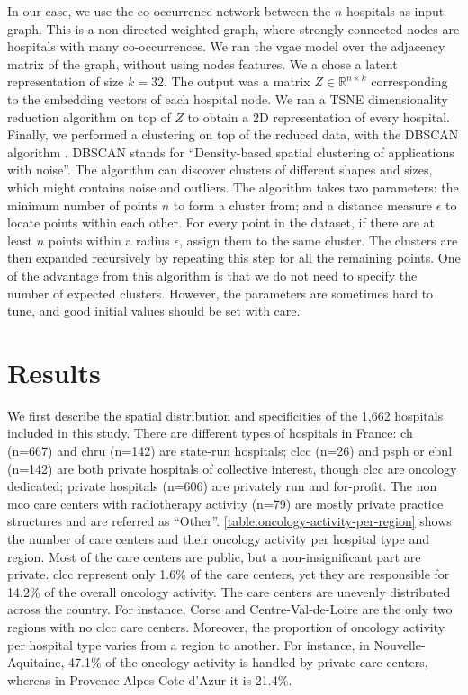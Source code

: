 In our case, we use the co-occurrence network between the $n$ hospitals as input
graph. This is a non directed weighted graph, where strongly connected nodes are
hospitals with many co-occurrences. We ran the \ac{vgae} model over the
adjacency matrix of the graph, without using nodes features. We a chose a latent
representation  of size $k=32$. The output was a matrix $Z \in \mathbb{R}^{n
        \times k }$ corresponding to the embedding vectors of each hospital node. We ran
a TSNE \cite{van_der_maaten_viualizing_2008} dimensionality reduction algorithm
on top of $Z$ to obtain a 2D representation of every hospital. Finally, we
performed a clustering on top of the reduced data, with the DBSCAN algorithm
\cite{ester_density-based_1996}. DBSCAN stands for ``Density-based spatial
clustering of applications with noise''. The algorithm can discover clusters of
different shapes and sizes, which might contains noise and outliers. The
algorithm takes two parameters: the minimum number of points $n$ to form a
cluster from; and a distance measure $\epsilon$ to locate points within each
other. For every point in the dataset, if there are at least $n$ points within a
radius $\epsilon$, assign them to the same cluster. The clusters are then
expanded recursively by repeating this step for all the remaining points. One of
the advantage from this algorithm is that we do not need to specify the number
of expected clusters. However, the parameters are sometimes hard to tune,
and good initial values should be set with care.


\section{Results}

We first describe the spatial distribution and specificities of the 1,662
hospitals included in this study. There are different types of hospitals in
France: \ac{ch}  (n=667) and \ac{chru}  (n=142) are state-run hospitals;
\ac{clcc} (n=26) and \ac{psph} or \ac{ebnl} (n=142) are both private hospitals of
collective interest, though \ac{clcc} are oncology dedicated; private hospitals
(n=606) are privately run and for-profit. The non \ac{mco} care centers with
radiotherapy activity (n=79) are mostly private practice structures and are
referred as “Other”. \cref{table:oncology-activity-per-region} shows the number
of care centers and their oncology activity per hospital type and region. Most
of the care centers are public, but a non-insignificant part are private.
\ac{clcc} represent only 1.6\% of the care centers, yet they are responsible for
14.2\% of the overall oncology activity. The care centers are unevenly
distributed across the country. For instance, Corse and Centre-Val-de-Loire are
the only two regions with no \ac{clcc} care centers. Moreover, the proportion of
oncology activity per hospital type varies from a region to another. For
instance, in Nouvelle-Aquitaine, 47.1\% of the oncology activity is handled by
private care centers, whereas in Provence-Alpes-Cote-d'Azur it is 21.4\%.

